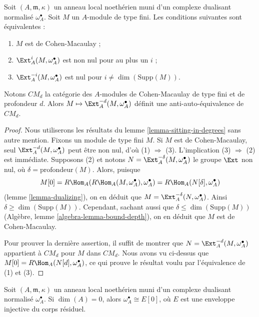 \begin{lemma}
\label{lemma-local-CM}
Soit $(A, \mathfrak m, \kappa)$ un anneau local noethérien muni d'un complexe dualisant normalisé $\omega_A^\bullet$.
Soit $M$ un $A$-module de type fini. Les conditions suivantes sont équivalentes :
\begin{enumerate}
\item $M$ est de Cohen-Macaulay ;
\item $\Ext^i_A(M, \omega_A^\bullet)$ est non nul pour au plus un $i$ ;
\item $\Ext^{-i}_A(M, \omega_A^\bullet)$ est nul pour $i \not = \dim(\text{Supp}(M))$.
\end{enumerate}
Notons $CM_d$ la catégorie des $A$-modules de Cohen-Macaulay
de type fini et de profondeur $d$.
Alors $M \mapsto \Ext^{-d}_A(M, \omega_A^\bullet)$ définit une anti-auto-équivalence de $CM_d$.
\end{lemma}

\begin{proof}
Nous utiliserons les résultats du lemme \ref{lemma-sitting-in-degrees} sans autre mention.
Fixons un module de type fini $M$. Si $M$ est de Cohen-Macaulay,
seul $\Ext^{-d}_A(M, \omega_A^\bullet)$ peut être non nul, d'où (1) $\Rightarrow$ (3).
L'implication (3) $\Rightarrow$ (2) est immédiate.
Supposons (2) et notons $N = \Ext^{-\delta}_A(M, \omega_A^\bullet)$ le groupe $\Ext$ non nul, où $\delta = \text{profondeur}(M)$.
Alors, puisque
$$
M[0] = R\Hom_A(R\Hom_A(M, \omega_A^\bullet), \omega_A^\bullet) =
R\Hom_A(N[\delta], \omega_A^\bullet)
$$
(lemme \ref{lemma-dualizing}), on en déduit que $M = \Ext_A^{-\delta}(N, \omega_A^\bullet)$.
Ainsi $\delta \geq \dim(\text{Supp}(M))$. Cependant, sachant aussi que $\delta \leq \dim(\text{Supp}(M))$
(Algèbre, lemme \ref{algebra-lemma-bound-depth}), on en déduit que $M$ est de Cohen-Macaulay.

\medskip\noindent
Pour prouver la dernière assertion, il suffit de montrer que $N = \Ext^{-d}_A(M, \omega_A^\bullet)$
appartient à $CM_d$ pour $M$ dans $CM_d$.
Nous avons vu ci-dessus que $M[0] = R\Hom_A(N[d], \omega_A^\bullet)$, ce qui prouve le résultat voulu
par l'équivalence de (1) et (3).
\end{proof}

\begin{lemma}
\label{lemma-dualizing-artinian}
Soit $(A, \mathfrak m, \kappa)$ un anneau local noethérien muni d'un complexe dualisant normalisé $\omega_A^\bullet$.
Si $\dim(A) = 0$, alors $\omega_A^\bullet \cong E[0]$,
où $E$ est une enveloppe injective du corps résiduel.
\end{lemma}

